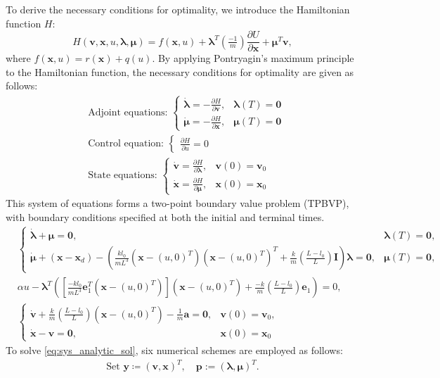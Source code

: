 \documentclass[a4paper, 10pt]{article}
\begin{document}
To derive the necessary conditions for optimality, we introduce the Hamiltonian function $H$:
\[
H(\bm{v},\bm{x},u,\bm{\lambda},\bm{\mu}) =
f(\bm{x},u) +  \bm{\lambda}^{T} \!\left(\tfrac{-1}{m}\right)\!\frac{\partial U}{\partial\bm{x}} + \bm{\mu}^{T} \bm{v},
\]
where $f(\bm{x},u) = r(\bm{x}) + q(u)$. By applying Pontryagin's maximum principle to the Hamiltonian function, the necessary conditions for optimality are given as follows:
\begin{align*}
 & \text{Adjoint equations: }
\begin{cases}
\dot{\bm{\lambda}} = -\frac{\partial H}{\partial \bm{v}}, & \bm{\lambda}(T) = \bm{0} \\
\dot{\bm{\mu}} = -\frac{\partial H}{\partial \bm{x}}, & \bm{\mu}(T)= \bm{0}
\end{cases} \\
& \text{Control equation: }
\begin{cases}
\frac{\partial H}{\partial u} = 0
\end{cases} \\
& \text{State equations: }
\begin{cases}
\dot{\bm{v}} = \frac{\partial H}{\partial \bm{\lambda}}, & \bm{v}(0) = \bm{v}_{0} \\
\dot{\bm{x}} = \frac{\partial H}{\partial \bm{\mu}}, & \bm{x}(0) = \bm{x}_{0}
\end{cases}
\end{align*}
This system of equations forms a two-point boundary value problem (TPBVP), with boundary conditions specified at both the initial and terminal times.
\begin{equation}
\label{eq:sys_analytic_sol}
\begin{aligned}
& \begin{cases}
\dot{\bm{\lambda}} + \bm{\mu} = \bm{0}, &  \bm{\lambda}(T) = \bm{0},
\\
\dot{\bm{\mu}} + (\bm{x} - \bm{x}_d)- \left(\tfrac{kl_0}{mL^3}(\bm{x} -(u,0)^{T})(\bm{x}-(u,0)^{T})^{T} + \tfrac{k}{m}\!\left(\tfrac{L-l_0}{L}\right)\bm{I}\right)\bm{\lambda} = \bm{0}, & \bm{\mu}(T) = \bm{0},
\end{cases}
\\
& \alpha u - \bm{\lambda}^{T}\!\left( \left[\tfrac{-kl_0}{mL^{3}}\bm{e}_1^{T}(\bm{x}-(u,0)^{T})\right]\!(\bm{x} - (u,0)^{T}) + \tfrac{-k}{m} \!\left(\tfrac{L-l_0}{L}\right)\bm{e}_1 \right) = 0,
\\
& \begin{cases}
\dot{\bm{v}} + \tfrac{k}{m}\!\left(\tfrac{L-l_0}{L}\right)\!(\bm{x}-(u,0)^{T})-\tfrac{1}{m}\bm{a} = \bm{0}, & \bm{v}(0) = \bm{v}_0,
\\
\dot{\bm{x}} -\bm{v} = \bm{0}, & \bm{x}(0) = \bm{x}_0
\end{cases}
\end{aligned}
\end{equation}
To solve \eqref{eq:sys_analytic_sol}, six numerical schemes are employed as follows:
\begin{align*}
\text{Set } \bm{y}\coloneqq (\bm{v},\bm{x})^{T}, \quad \bm{p} := (\bm{\lambda},\bm{\mu})^{T}.
\end{align*}
\end{document}
